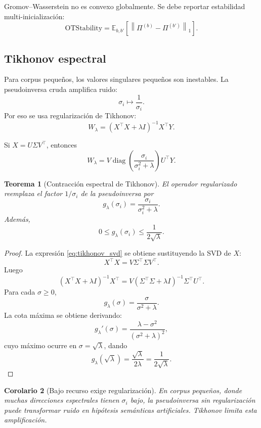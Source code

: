 \documentclass[11pt,a4paper]{article}
\newtheorem{theorem}{Teorema}[section]
\newtheorem{corollary}[theorem]{Corolario}
\DeclareMathOperator{\diag}{diag}
\newcommand{\E}{\mathbb{E}}
\newcommand{\1}{\mathbf{1}}
\newcommand{\norm}[1]{\left\lVert #1 \right\rVert}
\numberwithin{equation}{section}
\begin{document}
Gromov--Wasserstein no es convexo globalmente. Se debe reportar estabilidad multi-inicialización:
\begin{equation}
    \mathrm{OTStability}=\E_{b,b'}\left[\norm{\Pi^{(b)}-\Pi^{(b')}}_1\right].
\end{equation}

\subsection{Tikhonov espectral}

Para corpus pequeños, los valores singulares pequeños son inestables. La pseudoinversa cruda amplifica ruido:
\[
    \sigma_i \mapsto \frac{1}{\sigma_i}.
\]
Por eso se usa regularización de Tikhonov:
\begin{equation}
    W_\lambda
    =
    (X^\top X+\lambda I)^{-1}X^\top Y.
\end{equation}

Si \(X=U\Sigma V^\top\), entonces
\begin{equation}
    W_\lambda
    =
    V
    \diag\left(
    \frac{\sigma_i}{\sigma_i^2+\lambda}
    \right)
    U^\top Y.
    \label{eq:tikhonov_svd}
\end{equation}

\begin{theorem}[Contracción espectral de Tikhonov]
El operador regularizado reemplaza el factor \(1/\sigma_i\) de la pseudoinversa por
\[
    g_\lambda(\sigma_i)
    =
    \frac{\sigma_i}{\sigma_i^2+\lambda}.
\]
Además,
\[
    0\leq g_\lambda(\sigma_i)\leq \frac{1}{2\sqrt{\lambda}}.
\]
\end{theorem}

\begin{proof}
La expresión \eqref{eq:tikhonov_svd} se obtiene sustituyendo la SVD de \(X\):
\[
    X^\top X=V\Sigma^\top\Sigma V^\top.
\]
Luego
\[
    (X^\top X+\lambda I)^{-1}X^\top
    =
    V(\Sigma^\top\Sigma+\lambda I)^{-1}\Sigma^\top U^\top.
\]
Para cada \(\sigma\geq 0\),
\[
    g_\lambda(\sigma)=\frac{\sigma}{\sigma^2+\lambda}.
\]
La cota máxima se obtiene derivando:
\[
    g_\lambda'(\sigma)
    =
    \frac{\lambda-\sigma^2}{(\sigma^2+\lambda)^2},
\]
cuyo máximo ocurre en \(\sigma=\sqrt{\lambda}\), dando
\[
    g_\lambda(\sqrt{\lambda})
    =
    \frac{\sqrt{\lambda}}{2\lambda}
    =
    \frac{1}{2\sqrt{\lambda}}.
\]
\end{proof}

\begin{corollary}[Bajo recurso exige regularización]
En corpus pequeños, donde muchas direcciones espectrales tienen \(\sigma_i\) bajo, la pseudoinversa sin regularización puede transformar ruido en hipótesis semánticas artificiales. Tikhonov limita esta amplificación.
\end{corollary}
\end{document}
